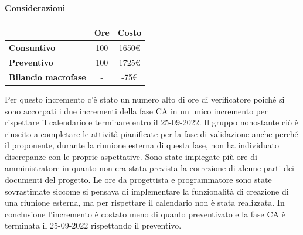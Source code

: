 \paragraph{Considerazioni} \hfill \break
\begin{center}
	\renewcommand{\arraystretch}{1.8}
	\begin{tabular}{ | l |c|c| }
    \hline
    & \textbf{Ore} & \textbf{Costo} \\
	\hline
    \textbf{Consuntivo} & 100 & 1650\euro \\
    \hline
    \textbf{Preventivo} & 100 & 1725\euro \\
    \hline
    \textbf{Bilancio macrofase} & - & -75\euro \\
    \hline
    \end{tabular}
\end{center}
Per questo incremento c'è stato un numero alto di ore di verificatore poiché si sono accorpati i due incrementi della fase CA in un unico incremento per rispettare il calendario e terminare
entro il 25-09-2022. Il gruppo nonostante ciò è riuscito a completare le attività pianificate per la fase di validazione anche perché il proponente, durante la riunione
esterna di questa fase, non ha individuato discrepanze con le proprie aspettative. Sono state impiegate più ore di amministratore in quanto non era stata prevista la correzione di alcune parti dei documenti del progetto.
Le ore da progettista e programmatore sono state sovrastimate siccome si pensava di implementare la funzionalità di creazione di una riunione esterna, ma per rispettare il calendario non è stata realizzata. In conclusione
l'incremento è costato meno di quanto preventivato e la fase CA è terminata il 25-09-2022 rispettando il preventivo.